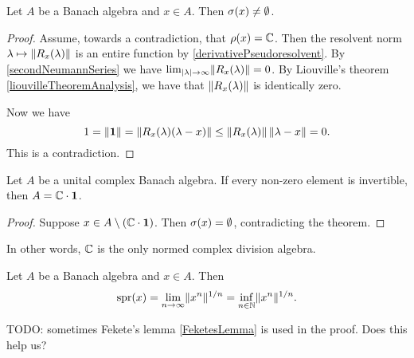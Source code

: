 \begin{proposition} \label{spectrumNonEmpty}
Let $A$ be a Banach algebra and $x\in A$. Then $\sigma(x)\neq \emptyset$.
\end{proposition}
\begin{proof}
Assume, towards a contradiction, that $\rho(x) = \mathbb{C}$. Then the resolvent norm $\lambda\mapsto \lVert R_x(\lambda)\rVert$ is an entire function by \ref{derivativePseudoresolvent}. By \ref{secondNeumannSeries} we have $\lim_{|\lambda|\to\infty}\lVert R_x(\lambda)\rVert = 0$. By Liouville's theorem \ref{liouvilleTheoremAnalysis}, we have that $\lVert R_x(\lambda)\rVert$ is identically zero.

Now we have
\[ 1 = \lVert\boldsymbol{\mathrm{1}}\rVert = \lVert R_x(\lambda)(\lambda-x)\rVert \leq \lVert R_x(\lambda)\rVert\,\lVert\lambda - x\rVert = 0. \]
This is a contradiction.
\end{proof}
\begin{corollary} \label{GelfandMazur}
Let $A$ be a unital complex Banach algebra. If every non-zero element is invertible, then $A=\mathbb{C}\cdot \boldsymbol{\mathrm{1}}$.
\end{corollary}
\begin{proof}
Suppose $x\in A\setminus (\mathbb{C}\cdot\boldsymbol{\mathrm{1}})$. Then $\sigma(x) = \emptyset$, contradicting the theorem.
\end{proof}
In other words, $\mathbb{C}$ is the only normed complex division algebra.


\begin{proposition} \label{spectralRadiusFormula}
Let $A$ be a Banach algebra and $x\in A$. Then
\[ \operatorname{spr}(x) = \lim_{n\to\infty}\lVert x^n\rVert^{1/n} = \inf_{n\in\mathbb{N}}\lVert x^n\rVert^{1/n}. \]
\end{proposition}
TODO: sometimes Fekete's lemma \ref{FeketesLemma} is used in the proof. Does this help us?

